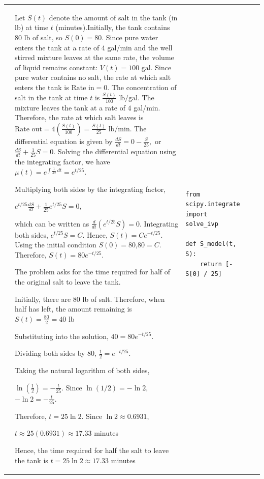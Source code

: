 \documentclass[a4paper,12pt]{article}
\begin{document}
\begin{longtable}{|p{0.3cm}|p{}|p{10cm}|p{}|p{1.5cm}|}
              &Let $S(t)$ denote the amount of salt in the tank (in lb) at time $t$ (minutes).Initially, the tank contains $80$ lb of salt, so $S(0)=80.$ Since pure water enters the tank at a rate of $4$ gal/min and the well stirred mixture leaves at the same rate, the volume of liquid remains constant:
$V(t)=100\text{ gal}.$ Since pure water contains no salt, the rate at which salt enters the tank is $\text{Rate in}=0.$ The concentration of salt in the tank at time $t$ is $\frac{S(t)}{100}\text{ lb/gal}.$ The mixture leaves the tank at a rate of $4$ gal/min. Therefore, the rate at which salt leaves is $\text{Rate out}=4\left(\frac{S(t)}{100}\right)
=\frac{S(t)}{25}\text{ lb/min}.$
The differential equation is given by
$\frac{dS}{dt}=0-\frac{S}{25},$
or $\frac{dS}{dt}+\frac{1}{25}S=0.$
Solving the differential equation using the integrating factor, we have
$\mu(t)=e^{\int\frac{1}{25}\,dt}=e^{t/25}.$

Multiplying both sides by the integrating factor,

$e^{t/25}\frac{dS}{dt}
+\frac{1}{25}e^{t/25}S=0,$

which can be written as $\frac{d}{dt}\left(e^{t/25}S\right)=0.$
Integrating both sides, $e^{t/25}S=C.$
Hence, $S(t)=Ce^{-t/25}.$
Using the initial condition $S(0)=80$,$80=C.$
Therefore, $S(t)=80e^{-t/25}.$

The problem asks for the time required for half of the original salt to leave the tank.

Initially, there are $80$ lb of salt. Therefore, when half has left, the amount remaining is $S(t)=\frac{80}{2}=40$ lb

Substituting into the solution, $40=80e^{-t/25}.$

Dividing both sides by $80$, $\frac{1}{2}=e^{-t/25}.$

Taking the natural logarithm of both sides,

$\ln\left(\frac{1}{2}\right)=-\frac{t}{25}.$ Since $\ln(1/2)=-\ln 2$, $-\ln 2=-\frac{t}{25}.$

Therefore, $t=25\ln 2.$ Since $\ln 2\approx0.6931$,

$t\approx25(0.6931)\approx17.33$ minutes

Hence, the time required for half the salt to leave the tank is $ t=25\ln 2\approx17.33$ minutes

 &\begin{verbatim}
from scipy.integrate import solve_ivp

def S_model(t, S):
    return [-S[0] / 25]


\end{verbatim}
\end{longtable}
\end{document}

